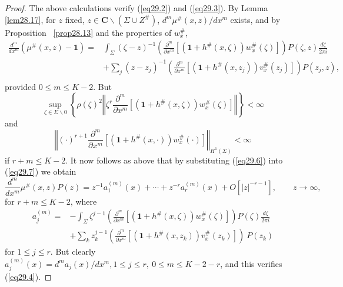 \documentclass{surv-l}
\theoremstyle{plain}
\theoremstyle{definition}
\numberwithin{equation}{chapter}
\begin{document}
\begin{proof}
The above calculations verify (\ref{eq29.2}) and (\ref{eq29.3}). By Lemma \ref{lem28.17}, for $z$ fixed, $z\in \mathbf{C}\backslash (\Sigma\cup Z^{\#})$, $d^{m}\mu^{\#}(x, z)/dx^{m}$ exists, and by Proposition ~\ref{prop28.13} and the properties of $w_{x}^{\#}$,
\begin{align}\label{eq29.7}
\frac{d^{m}}{dx^{m}}(\mu^{\#} (x, z)-\mathbf{1})=&\int_{\Sigma}(\zeta-z)^{-1}\left(\frac{\partial^{m}}{\partial x^{m}}[(\mathbf{1}+h^{\#}(x, \zeta))w_{x}^{\#}(\zeta)]\right)P(\zeta,z)\frac{d{\zeta}}{2\pi i}\\\nonumber
&+\sum_{j}(z-z_{j})^{-1}\left(\frac{\partial^{m}}{\partial x^{m}}[(\mathbf{1}+h^{\#}(x, z_{j}))v_{x}^{\#}(z_{j})]\right)P(z_{j},z),\,\\ \nonumber
\end{align}
provided $0\leq m\leq K-2$. But
\begin{equation*}
\sup_{\zeta\in\Sigma\backslash 0}\left\{\rho(\zeta)^{2}\left\Vert\zeta^{r}\frac{\partial^{m}}{\partial x^{m}}[(\mathbf{1}+h^{\#}(x, \zeta))w_{x}^{\#}(\zeta)]\right\Vert\right\}<\infty
\end{equation*}
and
\begin{equation*}
\left\Vert(\cdot)^{r+1}\frac{\partial^{m}}{\partial x^{m}}[(\mathbf{1}+h^{\#}(x, \cdot))w_{x}^{\#}(\cdot)]\right\Vert_{H^{1}(\Sigma)}<\infty
\end{equation*}
if $r+m\leq K-2$. It now follows as above that by substituting (\ref{eq29.6}) into (\ref{eq29.7}) we obtain
\begin{equation*}
\frac{d^{m}}{dx^{m}}\mu^{\#} (x, z)P(z)=z^{-1}a_{1}^{(m)}(x)+\cdots +z^{-r}a_{r}^{(m)}(x)+O[|z|^{-r-1}],\qquad  z\rightarrow\infty,
\end{equation*}
for $r+m\leq K-2$, where
\begin{align*}
a_{j}^{(m)}=&-\int_{\Sigma}\zeta^{j-1}\left(\frac{\partial^{m}}{\partial x^{m}}[(\mathbf{1}+h^{\#} (x, \zeta))w_{x}^{\#}(\zeta)]\right)P(\zeta)\frac{d \zeta}{2\pi i}\\
&+\sum_{k}z_{k}^{j-1}\left(\frac{\partial^{m}}{\partial x^{m}}[(\mathbf{1}+h^{\#}(x, z_{k}))v_{x}^{\#}(z_{k})]\right)\ P(z_{k})
\end{align*}
for $1\leq j\leq r$. But clearly $a_{j}^{(m)}(x)=d^{m}a_{j}(x)/dx^{m},1\leq j\leq r,\ 0\leq m\leq K-2-r$, and this verifies (\ref{eq29.4}).


\end{proof}
\end{document}
